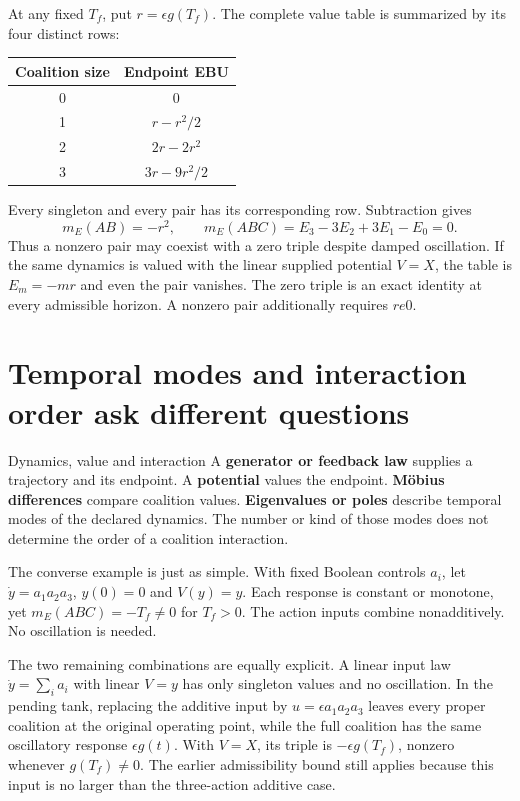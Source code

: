 At any fixed $T_f$, put $r=\epsilon g(T_f)$. The complete value table is summarized by its four distinct rows:
\begin{center}
\begin{tabular}{@{}cc@{}}\toprule
Coalition size & Endpoint EBU\\\midrule
0 & $0$\\
1 & $r-r^2/2$\\
2 & $2r-2r^2$\\
3 & $3r-9r^2/2$\\\bottomrule
\end{tabular}
\end{center}
Every singleton and every pair has its corresponding row. Subtraction gives
\begin{equation}\label{eq:oscillatory-zero-triple}
 m_E(AB)=-r^2,\qquad
 m_E(ABC)=E_3-3E_2+3E_1-E_0=0.
\end{equation}
Thus a nonzero pair may coexist with a zero triple despite damped oscillation. If the same dynamics is valued with the linear supplied potential $V=X$, the table is $E_m=-mr$ and even the pair vanishes. The zero triple is an exact identity at every admissible horizon. A nonzero pair additionally requires $r
e0$.

\section{Temporal modes and interaction order ask different questions}
\begin{lawbox}{Dynamics, value and interaction}
A \textbf{generator or feedback law} supplies a trajectory and its endpoint. A \textbf{potential} values the endpoint. \textbf{Möbius differences} compare coalition values. \textbf{Eigenvalues or poles} describe temporal modes of the declared dynamics. The number or kind of those modes does not determine the order of a coalition interaction.
\end{lawbox}

The converse example is just as simple. With fixed Boolean controls $a_i$, let $\dot y=a_1a_2a_3$, $y(0)=0$ and $V(y)=y$. Each response is constant or monotone, yet $m_E(ABC)=-T_f\ne0$ for $T_f>0$. The action inputs combine nonadditively. No oscillation is needed.

The two remaining combinations are equally explicit. A linear input law $\dot y=\sum_i a_i$ with linear $V=y$ has only singleton values and no oscillation. In the pending tank, replacing the additive input by $u=\epsilon a_1a_2a_3$ leaves every proper coalition at the original operating point, while the full coalition has the same oscillatory response $\epsilon g(t)$. With $V=X$, its triple is $-\epsilon g(T_f)$, nonzero whenever $g(T_f)\ne0$. The earlier admissibility bound still applies because this input is no larger than the three-action additive case.


